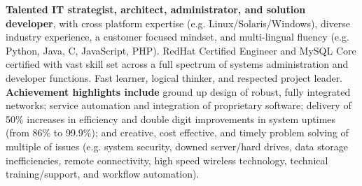  

\begin{rubric}{}
\entry*\textbf{Talented IT strategist, architect, administrator, and solution developer}, with cross platform expertise (e.g. Linux/Solaris/Windows), diverse industry experience, a customer focused mindset, and multi-lingual fluency (e.g. Python, Java, C, JavaScript, PHP).  RedHat Certified Engineer and MySQL Core certified with vast skill set across a full spectrum of systems administration and developer functions. Fast learner, logical thinker, and respected project leader.\\
        \entry*\textbf{Achievement highlights include} ground up design of robust, fully integrated networks; service automation and integration of proprietary software; delivery of 50\% increases in efficiency and double digit improvements in system uptimes (from 86\% to 99.9\%); and creative, cost effective, and timely problem solving of multiple of issues (e.g. system security, downed server/hard drives, data storage inefficiencies, remote connectivity, high speed wireless technology, technical training/support, and workflow automation).
\end{rubric}

